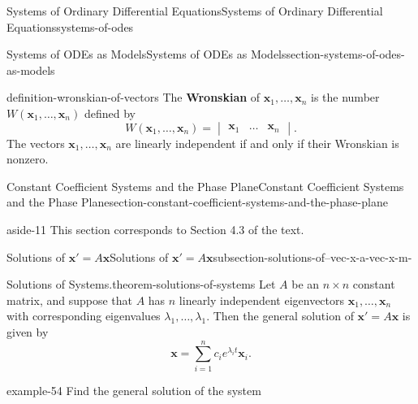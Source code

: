 \documentclass[oneside,10pt,]{book}
\newcommand{\terminology}[1]{\textbf{#1}}
\numberwithin{equation}{section}
\renewcommand{\vec}[1]{\mathbf{#1}}
\newcommand{\amp}{&}
\begin{document}
\begin{chapterptx}{Systems of Ordinary Differential Equations}{}{Systems of Ordinary Differential Equations}{}{}{systems-of-odes}
\begin{sectionptx}{Systems of ODEs as Models}{}{Systems of ODEs as Models}{}{}{section-systems-of-odes-as-models}
\begin{definition}{}{definition-wronskian-of-vectors}
\hypertarget{p-324}{}%
The \terminology{Wronskian} of \(\vec{x}_{1},\dots,\vec{x}_{n}\) is the number \(W(\vec{x}_{1},\dots,\vec{x}_{n})\) defined by%
\begin{equation*}
W(\vec{x}_{1},\dots,\vec{x}_{n}) = \begin{vmatrix}\vec{x}_{1}  \amp  \dots   \amp  \vec{x}_{n}\end{vmatrix}.
\end{equation*}
The vectors \(\vec{x}_{1},\dots,\vec{x}_{n}\) are linearly independent if and only if their Wronskian is nonzero.%
\end{definition}
\end{sectionptx}
%
%
\typeout{************************************************}
\typeout{************************************************}
%
\begin{sectionptx}{Constant Coefficient Systems and the Phase Plane}{}{Constant Coefficient Systems and the Phase Plane}{}{}{section-constant-coefficient-systems-and-the-phase-plane}
\begin{introduction}{}%
\begin{aside}{}{aside-11}%
\hypertarget{p-325}{}%
This section corresponds to Section 4.3 of the text.%
\end{aside}
\end{introduction}%
%
%
\typeout{************************************************}
\typeout{Subsection 4.2.1 Solutions of \(\vec{x}' = A\vec{x}\)}
\typeout{************************************************}
%
\begin{subsectionptx}{Solutions of \(\vec{x}' = A\vec{x}\)}{}{Solutions of \(\vec{x}' = A\vec{x}\)}{}{}{subsection-solutions-of--vec-x-a-vec-x-m-}
\begin{theorem}{Solutions of Systems.}{}{theorem-solutions-of-systems}%
\hypertarget{p-326}{}%
Let \(A\) be an \(n\times n\) constant matrix, and suppose that \(A\) has \(n\) linearly independent eigenvectors \(\vec{x}_{1},\dots,\vec{x}_{n}\) with corresponding eigenvalues \(\lambda_{1},\dots,\lambda_{1}\). Then the general solution of \(\vec{x}'=A\vec{x}\) is given by%
\begin{equation*}
\vec{x} = \sum_{i=1}^{n}c_{i}e^{\lambda_{i}t}\vec{x}_{i}.
\end{equation*}
%
\end{theorem}
\begin{example}{}{example-54}%
\hypertarget{p-327}{}%
Find the general solution of the system%
\begin{align*}

\end{align*}
\end{example}
\end{subsectionptx}
\end{sectionptx}
\end{chapterptx}
\end{document}

